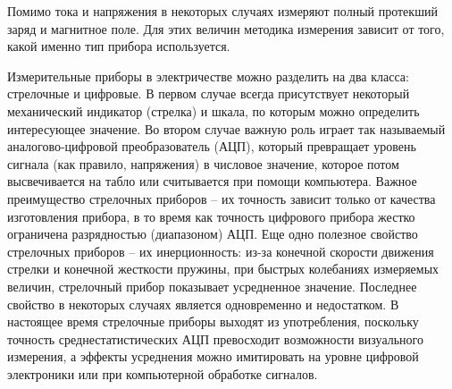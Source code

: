 Помимо тока и напряжения в некоторых случаях измеряют полный протекший заряд и магнитное поле. Для этих величин методика измерения зависит от того, какой именно тип прибора используется.

Измерительные приборы в электричестве можно разделить на два класса: стрелочные и цифровые. В первом случае всегда присутствует некоторый механический индикатор (стрелка) и шкала, по которым можно определить интересующее значение. Во втором случае важную роль играет так называемый аналогово-цифровой преобразователь (АЦП), который превращает уровень сигнала (как правило, напряжения) в числовое значение, которое потом высвечивается на табло или считывается при помощи компьютера. Важное преимущество стрелочных приборов -- их точность зависит только от качества изготовления прибора, в то время как точность цифрового прибора жестко ограничена разрядностью (диапазоном) АЦП. Еще одно полезное свойство стрелочных приборов -- их инерционность: из-за конечной скорости движения стрелки и конечной жесткости пружины, при быстрых колебаниях измеряемых величин, стрелочный прибор показывает усредненное значение. Последнее свойство в некоторых случаях является одновременно и недостатком. В настоящее время стрелочные приборы выходят из употребления, поскольку точность среднестатистических АЦП превосходит возможности визуального измерения, а эффекты усреднения можно имитировать на уровне цифровой электроники или при компьютерной обработке сигналов.